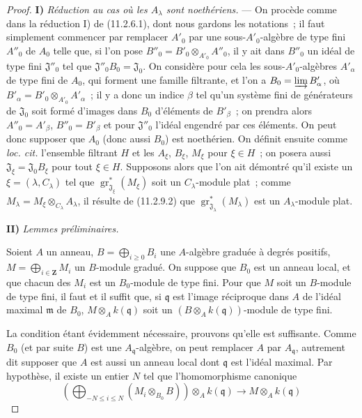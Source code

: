 \begin{proof}
\medskip
\noindent\textbf{I)} \emph{Réduction au cas où les $A_\lambda$ sont
noethériens.} --- On procède comme dans la réduction I) de (11.2.6.1), dont
nous gardons les notations~; il faut simplement commencer par remplacer
$A'_0$ par une sous-$A'_0$-algèbre de type fini $A''_0$ de $A_0$ telle que,
si l'on pose $B''_0=B'_0\otimes_{A'_0}A''_0$, il y ait dans $B''_0$ un idéal
de type fini $\mathfrak J''_0$ tel que $\mathfrak J''_0B_0=\mathfrak J_0$.
On considère pour cela les sous-$A'_0$-algèbres $A'_\alpha$ de type fini de
$A_0$, qui forment une famille filtrante, et l'on a
$B_0=\varinjlim B'_\alpha$, où
$B'_\alpha=B'_0\otimes_{A'_0}A'_\alpha$~; il y a donc un indice $\beta$ tel
qu'un système fini de générateurs de $\mathfrak J_0$ soit formé d'images dans
$B_0$ d'éléments de $B'_\beta$~; on prendra alors $A''_0=A'_\beta$,
$B''_0=B'_\beta$ et pour $\mathfrak J''_0$ l'idéal engendré par ces éléments.
On peut donc supposer que $A_0$ (donc aussi $B_0$) est noethérien. On définit
ensuite comme \emph{loc. cit.} l'ensemble filtrant $H$ et les $A_\xi$,
$B_\xi$, $M_\xi$ pour $\xi\in H$~; on posera aussi
$\mathfrak J_\xi=\mathfrak J_0B_\xi$ pour tout $\xi\in H$. Supposons alors
que l'on ait démontré qu'il existe un $\xi=(\lambda,C_\lambda)$ tel que
$\operatorname{gr}_{\mathfrak J_\xi}^*(M_\xi)$ soit un $C_\lambda$-module
plat~; comme $M_\lambda=M_\xi\otimes_{C_\lambda}A_\lambda$, il résulte de
(11.2.9.2) que $\operatorname{gr}_{\mathfrak J_\lambda}^*(M_\lambda)$ est un
$A_\lambda$-module plat.

\medskip
\noindent\textbf{II)} \emph{Lemmes préliminaires.}

\begin{lemma}[11.2.9.3]
\label{IV.11.2.9.3-fr}
Soient $A$ un anneau,
$B=\bigoplus_{i\geq0}B_i$ une $A$-algèbre graduée à degrés positifs,
$M=\bigoplus_{i\in\mathbf Z}M_i$ un $B$-module gradué. On suppose que $B_0$
est un anneau local, et que chacun des $M_i$ est un $B_0$-module de type fini.
Pour que $M$ soit un $B$-module de type fini, il faut et il suffit que, si
$\mathfrak q$ est l'image réciproque dans $A$ de l'idéal maximal $\mathfrak m$
de $B_0$, $M\otimes_Ak(\mathfrak q)$ soit un
$(B\otimes_Ak(\mathfrak q))$-module de type fini.
\end{lemma}

La condition étant évidemment nécessaire, prouvons qu'elle est suffisante.
Comme $B_0$ (et par suite $B$) est une $A_{\mathfrak q}$-algèbre, on peut
remplacer $A$ par $A_{\mathfrak q}$, autrement dit supposer que $A$ est aussi
un anneau local dont $\mathfrak q$ est l'idéal maximal. Par hypothèse, il existe
un entier $N$ tel que l'homomorphisme canonique
\[
\left(\bigoplus_{-N\leq i\leq N}(M_i\otimes_{B_0}B)\right)
\otimes_Ak(\mathfrak q)\longrightarrow M\otimes_Ak(\mathfrak q)
\]


\end{proof}
